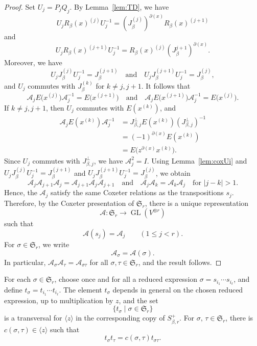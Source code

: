 \documentclass[reqno]{amsart}
\DeclareMathOperator{\GL}{GL}
\newcommand{\sym}{\mathfrak{S}}
\theoremstyle{definition}
\begin{document}
\begin{proof}
Set $U_j=P_jQ_j$.
By Lemma~\ref{lem:TD}, we have
\[
U_jR_\beta(x)^{(j)}U_j^{-1}
=
(J_\beta^{(j)})^{\partial(x)}R_\beta(x)^{(j+1)}
\]
and
\[
U_jR_\beta(x)^{(j+1)}U_j^{-1}
=
R_\beta(x)^{(j)}(J_\beta^{{j+1}})^{\partial(x)}.
\]
Moreover, we have
\[
U_jJ_\beta^{(j)}U_j^{-1}=J_\beta^{(j+1)}
\quad\text{and}\quad
U_jJ_\beta^{(j+1)}U_j^{-1}=J_\beta^{(j)},
\]
and $U_j$ commutes with $J_\beta^{(k)}$ for $k\neq j,j+1$. It follows that
\[
\mathcal A_jE\bigr(x^{(j)}\bigr)\mathcal A_j^{-1}
=
E\bigr(x^{(j+1)}\bigr)
\quad
\text{and}
\quad
\mathcal A_jE\bigr(x^{(j+1)}\bigr)\mathcal A_j^{-1}
=
E\bigr(x^{(j)}\bigr).
\]
If $k\neq j,j+1$, then $U_j$ commutes with $E(x^{(k)})$, 
and
\[
\begin{aligned}
\mathcal A_jE(x^{(k)})\mathcal A_j^{-1}
&=
J_{\beta,j}^{\perp}E(x^{(k)}) (J_{\beta,j}^{\perp})^{-1}\\
&=
(-1)^{\partial(x)}E(x^{(k)})\\
&=
E\bigl(z^{\partial(x)}x^{(k)}\bigr).
\end{aligned}
\]
Since $U_j$ commutes with $J_{\beta,j}^{\perp}$, we have $ \mathcal A_j^2
=I$. Using Lemma~\ref{lem:coxUi} and $
U_jJ_\beta^{(j)}U_j^{-1}=J_\beta^{(j+1)}$ and
$U_jJ_\beta^{(j+1)}U_j^{-1}=J_\beta^{(j)}$, we obtain
\[
\mathcal A_j\mathcal A_{j+1}\mathcal A_j
=
\mathcal A_{j+1}\mathcal A_j\mathcal A_{j+1}
\quad\text{and}\quad
\mathcal A_j\mathcal A_k
=
\mathcal A_k\mathcal A_j
\quad
\text{for }|j-k|>1.
\]
Hence, the $\mathcal A_j$ satisfy the same Coxeter relations as the transpositions
$s_j$. Therefore, by the Coxeter presentation of $\sym_r$, there is a
unique representation
\[
\mathcal A:\sym_r\longrightarrow\GL(V^{\otimes r})
\]
such that
\[
\mathcal A(s_j)=\mathcal A_j
\qquad
(1\leq j<r).
\]
For $\sigma\in\sym_r$, we write
\[
\mathcal A_\sigma=\mathcal A(\sigma).
\]
In particular, $\mathcal A_\sigma\mathcal A_\tau = \mathcal A_{\sigma\tau}
$ for all $\sigma,\tau\in\sym_r$,  and the result follows.
\end{proof}

For each $\sigma\in\sym_r$, choose once and for all a reduced expression
$\sigma=s_{i_1}\cdots s_{i_\ell}$, and define $ t_\sigma=t_{i_1}\cdots
t_{i_\ell}$.
The element $t_\sigma$ depends in general on the chosen reduced
expression, up to multiplication by $z$, and the set
\begin{equation}
\label{eq:transversal}
\{t_\sigma\mid \sigma\in\sym_r\}
\end{equation}
is a transversal for $\langle z\rangle$ in the corresponding copy of
$S_{\beta,r}^+$. 
For $\sigma,\,\tau\in\sym_r$, there is $c(\sigma,\tau)\in \langle
z\rangle$ such that
\[
t_\sigma t_\tau
=
c(\sigma,\tau)t_{\sigma\tau}.
\]
\end{document}
